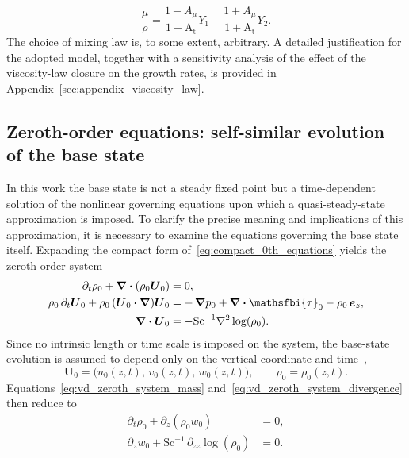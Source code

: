 \documentclass[11pt]{article}
\newcommand{\Atw}{\mathrm{A_t}}
\newcommand{\Sch}{\mathrm{Sc}}
\newcommand{\bnabla}{\boldsymbol{\nabla}}
\newcommand{\bcdot}{\boldsymbol{\cdot}}
\begin{document}
\begin{equation}
    \frac{\mu}{\rho} = \frac{1-A_{\mu}}{1-\Atw}Y_1 + \frac{1+A_{\mu}}{1+\Atw}Y_2.
    \label{eq:graham_mixing_law}
\end{equation}
The choice of mixing law is, to some extent, arbitrary. A detailed justification for the adopted model, together with a sensitivity analysis of the effect of the viscosity-law closure on the growth rates, is provided in Appendix~\ref{sec:appendix_viscosity_law}. 


\subsection{Zeroth-order equations: self-similar evolution of the base state}%
\label{subsec:zeroth_order_self_similar}
In this work the base state is not a steady fixed point but a time-dependent solution of the nonlinear governing equations upon which a quasi-steady-state approximation is imposed. To clarify the precise meaning and implications of this approximation, it is necessary to examine the equations governing the base state itself. Expanding the compact form of~\eqref{eq:compact_0th_equations} yields the zeroth-order system
\begin{subequations}
\begin{align}
    \partial_t \rho_0 + \bnabla\bcdot(\rho_0 \boldsymbol{U}_0) &= 0, \label{eq:vd_zeroth_system_mass} \\
    \rho_0\,\partial_t \boldsymbol{U}_0 + \rho_0\,(\boldsymbol{U}_0\bcdot\bnabla)\boldsymbol{U}_0 &= -\,\bnabla p_0 + \bnabla\bcdot\mathsfbi{\tau}_0 - \rho_0\,\boldsymbol{e}_z, \\
    \bnabla\bcdot\boldsymbol{U}_0 &= -\Sch^{-1}\nabla^2 \log(\rho_0). \label{eq:vd_zeroth_system_divergence}
\end{align}
\end{subequations}
Since no intrinsic length or time scale is imposed on the system, the base-state evolution is assumed to depend only on the vertical coordinate and time~\citep{prathama-pantano-2021},
\begin{equation}
    \boldsymbol{U}_0 = \bigl(u_0(z,t),\, v_0(z,t),\, w_0(z,t)\bigr), \qquad \rho_0 = \rho_0(z,t).
\end{equation}
Equations~\eqref{eq:vd_zeroth_system_mass} and~\eqref{eq:vd_zeroth_system_divergence} then reduce to
\begin{subequations}
\label{eq:base_state_1D}
\begin{align}
    \partial_t \rho_0 + \partial_z (\rho_0 w_0) &= 0, \\
    \partial_z w_0 + \Sch^{-1}\,\partial_{zz} \log(\rho_0) &= 0.
\end{align}
\end{subequations}
\end{document}
